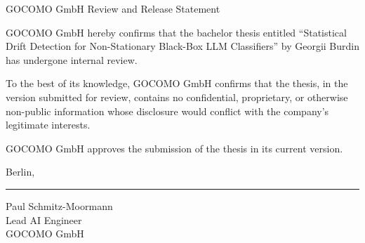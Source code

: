 \thispagestyle{empty}

\begin{center}
{\Large GOCOMO GmbH Review and Release Statement}
\end{center}

\vspace{1.2cm}

GOCOMO GmbH hereby confirms that the bachelor thesis entitled
``Statistical Drift Detection for Non-Stationary Black-Box LLM Classifiers''
by Georgii Burdin has undergone internal review.

To the best of its knowledge, GOCOMO GmbH confirms that the thesis, in the version submitted for review, contains no confidential, proprietary, or otherwise non-public information whose disclosure would conflict with the company's legitimate interests.

GOCOMO GmbH approves the submission of the thesis in its current version.

\vspace{2cm}

\noindent Berlin, \rule{4cm}{0.4pt}

\vspace{2cm}

\noindent\hrulefill

\vspace{0.4cm}

\noindent Paul Schmitz-Moormann\\
Lead AI Engineer\\
GOCOMO GmbH

\clearpage
